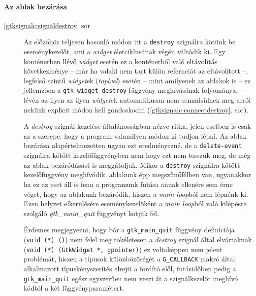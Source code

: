 \paragraph{Az ablak bezárása}

\begin{description}
 \item[\ref{gtksignalc:signaldestroy} sor] Az előzőhöz teljesen hasonló módon itt a \texttt{destroy} szignálra kötünk be eseménykezelőt, ami a \textit{widget} életciklusának végén váltódik ki. Egy konténerben llévő \textit{widget} esetén ez a konténerből való eltávolítás következménye -- már ha valaki nem tart külön refernciát az eltávolított \textit{} --, legfelső szintű \textit{widget}ek (\textit{toplvel}) esetén -- mint amilyenek az ablakok is -- ez jellemzően a \texttt{gtk\_widget\_destroy} függvény meghívásának folyománya, lévén az ilyen az ilyen \textit{widget}ek automatikusan nem semmisülnek meg arról nekünk explicit módon kell gondoskodni (\ref{gtksignalc:connectdestroy}. sor).

 A \textit{destroy} szignál kezelése általánosságban nézve ritka, jelen esetben is csak az a szerepe, hogy a program valamilyen módon ki tudjon lépni. Az ablak bezárása alapértelmezetten ugyan ezt eredményezné, de a \texttt{delete-event} szignálra kötött kezelőfüggvényben nem hogy ezt nem tesszük meg, de még az ablak bezáródásást is meggátoljuk. Mikor a \texttt{destroy} szignálra kötött kezelőfüggvény meghívódik, ablakunk épp megszűnőfélben van, ugyanakkor ha ez az eset áll is fenn a programunk futása annak ellenére sem érne véget, hogy az ablakunk bezáródik, hiszen a \textit{main loop}ból nem lépnénk ki. Ezen helyzet elkerülésére eseménykezelőként a \textit{main loop}ból való kilépésre szolgáló \textit{gtk\_main\_quit} függvényt kötjük fel.

Érdemes megjegyezni, hogy bár a \texttt{gtk\_main\_quit} függvény definíciója (\texttt{void (*) ()}) nem felel meg tökéletesen a \textit{destroy} szignál által elvártaknak (\texttt{void (*) (GtkWidget *, gpointer)}) ez voltaképpen nem jelent problémát, hiszen a típusok különbözőségét a \texttt{G\_CALLBACK} makró által alkalmazott típuskényszerítés elrejti a fordító elől, futásidőben pedig a \texttt{gtk\_main\_quit} egész egyszerűen nem veszi át a szignálkezelőt meghívó kódtól a két függvényparamétert.


\end{description}
